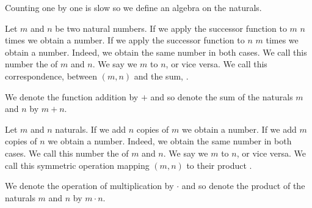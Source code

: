 
\sbasic











\sstart
{}


Counting one by one is slow so we define
an algebra on the naturals.


Let $m$ and $n$ be two natural numbers.
If we apply the successor function to $m$ $n$
times we obtain a number.
If we apply the successor function to $n$ $m$
times we obtain a number.
Indeed, we obtain the same number in both cases.
We call this number the 
of $m$ and $n$.
We say we  $m$ to $n$,
or vice versa.
We call this correspondence, between
$(m, n)$ and the sum, .


We denote the function addition by $+$
and so denote the sum of the naturals
$m$ and $n$ by $m + n$.


Let $m$ and $n$ naturals.
If we add $n$ copies of $m$ we obtain a number.
If we add $m$ copies of $n$ we obtain a number.
Indeed, we obtain the same number in both cases.
We call this number the  of $m$ and $n$.
We say we  $m$ to $n$, or vice versa.
We call this symmetric operation mapping $(m, n)$ to their product
.


We denote the operation of multiplication by
$\cdot$ and so denote the product of the naturals
$m$ and $n$ by $m \cdot n$.
\strats

